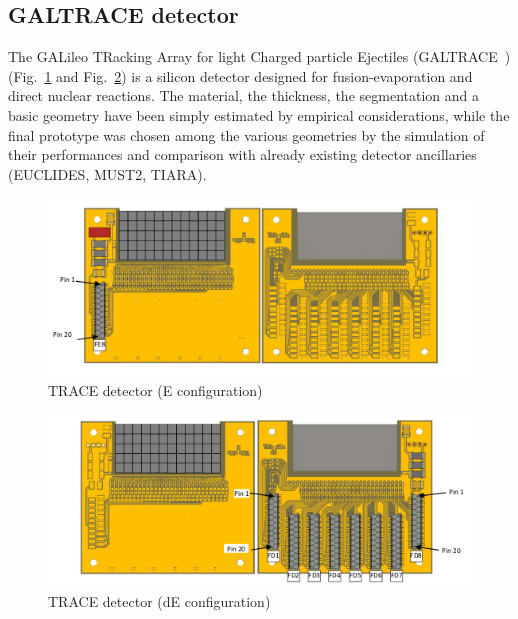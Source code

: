 \bigbreak

\subsection{GALTRACE detector}

The GALileo TRacking Array for light Charged particle Ejectiles (GALTRACE~\cite{mengoni2})
 (Fig.~\ref{trace:E} and Fig.~\ref{trace:dE}) is a silicon
detector designed for fusion-evaporation and direct nuclear reactions.
The material, the thickness, the segmentation and a basic geometry have been
simply estimated by empirical considerations, while the final prototype was
chosen among the various geometries by the simulation of their performances
and comparison with already existing detector ancillaries (EUCLIDES, MUST2,
TIARA).

\bigbreak

\begin{figure}[h]
  \centering
  \includegraphics[scale=.65]{img/trace_e.png}
  \caption{TRACE detector (E configuration)}
  \label{trace:E}
\end{figure}

\begin{figure}[h]
  \centering
  \includegraphics[scale=.65]{img/trace_de.png}
  \caption{TRACE detector (dE configuration)}
  \label{trace:dE}
\end{figure}

\bigbreak

